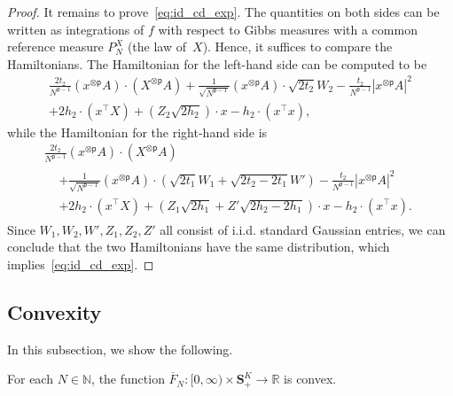 \documentclass[AHL,Unicode,longabstracts,published]{cedram}
\newcommand{\N}{\mathbb{N}}
\newcommand{\R}{\mathbb{R}}
\renewcommand{\S}{\mathbf{S}}
\newcommand{\sfp}{\mathsf{p}}
\renewcommand{\bar}{\overline}
\begin{document}
\begin{proof}
It remains to prove~\eqref{eq:id_cd_exp}. The quantities on both sides can be written as integrations of $f$ with respect to Gibbs measures with a common reference measure $P^X_N$ (the law of~$X$). Hence, it suffices to compare the Hamiltonians. The Hamiltonian for the left-hand side can be computed to be
\begin{multline*}
\frac{2t_2}{N^{\sfp-1}}\left(x^{\otimes\sfp}A\right)\cdot \left(X^{\otimes \sfp}A\right)+\frac{1}{\sqrt{N^{\sfp-1}}}\left(x^{\otimes \sfp}A\right)\cdot \sqrt{2t_2} W_2 - \frac{t_2}{N^{\sfp-1}}\left|x^{\otimes \sfp}A\right|^2\\
+ {2}h_2\cdot \left(x^\intercal X\right)+ \left(Z_2\sqrt{2h_2}\right)\cdot x- {h_2\cdot \left(x^\intercal x\right)},
\end{multline*}
while the Hamiltonian for the right-hand side is
\begin{multline*}
\frac{2t_2}{N^{\sfp-1}}\left(x^{\otimes\sfp}A\right)\cdot \left(X^{\otimes \sfp}A\right)\\
\begin{aligned}
&+\frac{1}{\sqrt{N^{\sfp-1}}}\left(x^{\otimes\sfp}A\right)\cdot \left(\sqrt{2t_1}W_1+\sqrt{2t_2-2t_1} W'\right) - \frac{t_2}{N^{\sfp-1}}|x^{\otimes \sfp}A|^2\\
&+ {2}h_2\cdot \left(x^\intercal X\right)+ \left(Z_1\sqrt{2h_1} + Z'\sqrt{2h_2-2h_1}\right)\cdot x- {h_2\cdot \left(x^\intercal x\right)}.
\end{aligned}
\end{multline*}
Since $W_1,W_2,W',Z_1,Z_2,Z'$ all consist of i.i.d. standard Gaussian entries, we can conclude that the two Hamiltonians have the same distribution, which implies~\eqref{eq:id_cd_exp}.
\end{proof}



\subsection{Convexity}

In this subsection, we show the following.

\begin{lemm}\label{l.F_N.conv}
For each $N\in\N$, the function $\bar F_N:[0,\infty)\times \S^K_+\to \R$ is convex.
\end{lemm}
\end{document}
